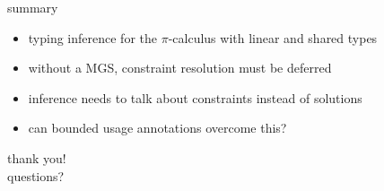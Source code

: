 \documentclass[dvipsnames]{beamer}
\newcommand{\sitem}{\item[\raisebox{.45ex}{\rule{.6ex}{.6ex}}]}
\theoremstyle{definition}\newtheorem{mytheorem}{Theorem}[section]
\newcommand{\picalc}{$\pi$-calculus}
\begin{document}
\begin{frame}{summary}
\begin{itemize}
\setlength\itemsep{1em}
\sitem typing inference for the \picalc{} with linear and shared types
\sitem without a MGS, constraint resolution must be deferred
\sitem inference needs to talk about constraints instead of solutions
\sitem can bounded usage annotations overcome this? 
\end{itemize}
\end{frame}

\begin{frame}
  \centering
  \Huge{thank you!} \\
  \Huge{questions?}
\end{frame}
\end{document}
